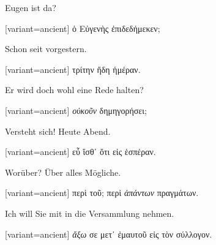 Eugen ist da?

\switchcolumn

\begin{greek}[variant=ancient]%
ὁ Εὐγενὴς ἐπιδεδήμεκεν;

\end{greek}%
\switchcolumn*

Schon seit vorgestern.

\switchcolumn

\begin{greek}[variant=ancient]%
τρίτην ἤδη ἡμέραν.

\end{greek}%
\switchcolumn*

Er wird doch wohl eine Rede halten?

\switchcolumn

\begin{greek}[variant=ancient]%
\emph{οὐκοῦν} δημηγορήσει;

\end{greek}%
\switchcolumn*

Versteht sich! Heute Abend.

\switchcolumn

\begin{greek}[variant=ancient]%
εὖ ἴσθ᾽ ὅτι εἰς ἑσπέραν.

\end{greek}%
\switchcolumn*

Worüber? Über alles Mögliche.

\switchcolumn

\begin{greek}[variant=ancient]%
περὶ τοῦ; περὶ \emph{ἁπάντων} πραγμάτων.

\end{greek}%
\switchcolumn*

Ich will Sie mit in die Versammlung nehmen.

\switchcolumn

\begin{greek}[variant=ancient]%
\emph{ἄξω} σε μετ᾽ ἐμαυτοῦ εἰς τὸν σύλλογον.

\end{greek}%
\switchcolumn*

